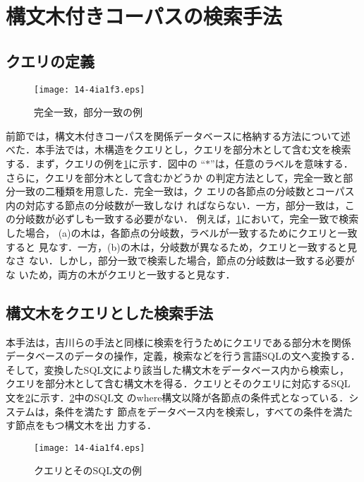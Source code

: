\documentclass[japanese]{jnlp_1.3e}
\begin{document}
\section{構文木付きコーパスの検索手法}
\label{retieve}

\subsection{クエリの定義}

\begin{figure}[t]
  \begin{center}
\texttt{[image: 14-4ia1f3.eps]}
	\caption{完全一致，部分一致の例}
    	\label{fig:query}
  \end{center}
\end{figure}

前節では，構文木付きコーパスを関係データベースに格納する方法について述
べた．本手法では，木構造をクエリとし，クエリを部分木として含む文を検索
する．まず，クエリの例を\figurename\ref{fig:query}に示す．図中の
``$\ast$''は，任意のラベルを意味する．さらに，クエリを部分木として含むかどうか
の判定方法として，完全一致と部分一致の二種類を用意した．完全一致は，ク
エリの各節点の分岐数とコーパス内の対応する節点の分岐数が一致しなけ
ればならない．一方，部分一致は，この分岐数が必ずしも一致する必要がない．
例えば，\figurename\ref{fig:query}において，完全一致で検索した場合，
(a)の木は，各節点の分岐数，ラベルが一致するためにクエリと一致すると
見なす．一方，(b)の木は，分岐数が異なるため，クエリと一致すると見なさ
ない．しかし，部分一致で検索した場合，節点の分岐数は一致する必要がな
いため，両方の木がクエリと一致すると見なす．



\subsection{構文木をクエリとした検索手法}

本手法は，吉川らの手法と同様に検索を行うためにクエリである部分木を関係
データベースのデータの操作，定義，検索などを行う言語SQLの文へ変換する．
そして，変換したSQL文により該当した構文木をデータベース内から検索し，
クエリを部分木として含む構文木を得る．クエリとそのクエリに対応するSQL
文を\figurename\ref{fig:sql}に示す．\figurename\ref{fig:sql}中のSQL文
のwhere構文以降が各節点の条件式となっている．システムは，条件を満たす
節点をデータベース内を検索し，すべての条件を満たす節点をもつ構文木を出
力する．

\begin{figure}[t]
  \begin{center}
\texttt{[image: 14-4ia1f4.eps]}
    \caption{クエリとそのSQL文の例}
    \label{fig:sql}
  \end{center}
\vspace{-1.3\baselineskip}
\end{figure}
\end{document}
